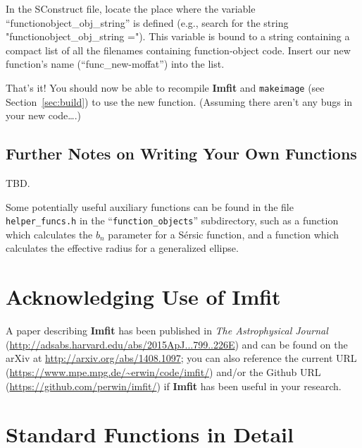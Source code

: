 \documentclass[10pt,a4paper,article]{memoir}
\newcommand{\imfit}{\textbf{Imfit}}
\newcommand{\Imfit}{\textbf{Imfit}}
\newcommand{\makeimage}{\texttt{makeimage}}
\begin{document}
In the SConstruct file, locate the place where the variable
``functionobject\_obj\_string'' is defined (e.g., search for the string
"functionobject\_obj\_string ="). This variable is bound to a string containing a
compact list of all the filenames containing function-object code. Insert our
new function's name (``func\_new-moffat'') into the list.

\bigskip

That's it! You should now be able to recompile \imfit{} and \makeimage{} 
(see Section~\ref{sec:build}) to use
the new function. (Assuming there aren't any bugs in your new code\ldots.)



\section{Further Notes on Writing Your Own Functions}

TBD.

Some potentially useful auxiliary functions can be found in the file
\texttt{helper\_funcs.h} in the ``\texttt{function\_objects}'' subdirectory,
such as a function which calculates the $b_{n}$ parameter for a S\'ersic
function, and a function which calculates the effective radius for a
generalized ellipse.

%
%



\newpage

\chapter{Acknowledging Use of \Imfit}

A paper describing \imfit{} \citep{erwin15} has been published in
\textit{The Astrophysical Journal}
(\url{http://adsabs.harvard.edu/abs/2015ApJ...799..226E}) and can be
found on the arXiv at \url{http://arxiv.org/abs/1408.1097}; you can also
reference the current URL
(\url{https://www.mpe.mpg.de/~erwin/code/imfit/}) and/or the Github URL
(\url{https://github.com/perwin/imfit/}) if \imfit{} has been useful in
your research.


\newpage

\appendix
\chapter{Standard Functions in Detail}\label{app:functions}
\end{document}
